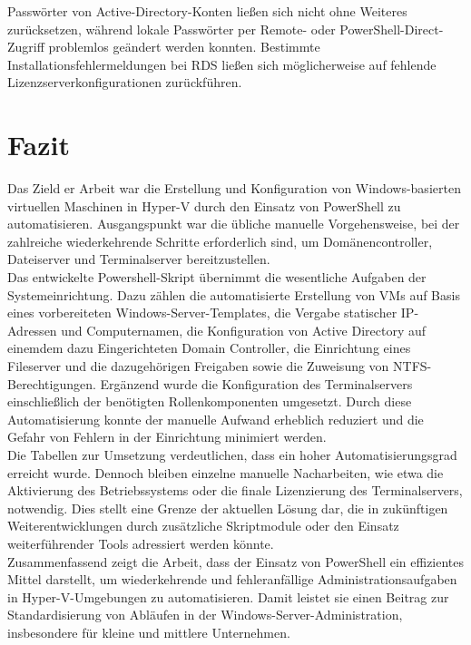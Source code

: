 \documentclass[a4paper,12pt]{article}
\begin{document}
Passwörter von Active-Directory-Konten ließen sich nicht ohne Weiteres zurücksetzen, während lokale Passwörter per Remote- oder PowerShell-Direct-Zugriff problemlos geändert werden konnten. Bestimmte Installationsfehlermeldungen bei RDS ließen sich möglicherweise auf fehlende Lizenzserverkonfigurationen zurückführen.\\

\newpage

\section{Fazit}

Das Zield er Arbeit war die Erstellung und Konfiguration von Windows-basierten virtuellen Maschinen in Hyper-V durch den Einsatz von PowerShell zu automatisieren.
Ausgangspunkt war die übliche manuelle Vorgehensweise, bei der zahlreiche wiederkehrende Schritte erforderlich sind, um Domänencontroller, Dateiserver und Terminalserver bereitzustellen.\\

Das entwickelte Powershell-Skript übernimmt die wesentliche Aufgaben der Systemeinrichtung. 
Dazu zählen die automatisierte Erstellung von VMs auf Basis eines vorbereiteten Windows-Server-Templates, die Vergabe statischer IP-Adressen und Computernamen, die Konfiguration von Active Directory auf einemdem dazu Eingerichteten Domain Controller, die Einrichtung eines Fileserver und die dazugehörigen Freigaben sowie die Zuweisung von NTFS-Berechtigungen. 
Ergänzend wurde die Konfiguration des Terminalservers einschließlich der benötigten Rollenkomponenten umgesetzt. 
Durch diese Automatisierung konnte der manuelle Aufwand erheblich reduziert und die Gefahr von Fehlern in der Einrichtung minimiert werden.\\

Die Tabellen zur Umsetzung verdeutlichen, dass ein hoher Automatisierungsgrad erreicht wurde.
Dennoch bleiben einzelne manuelle Nacharbeiten, wie etwa die Aktivierung des Betriebssystems oder die finale Lizenzierung des Terminalservers, notwendig.
Dies stellt eine Grenze der aktuellen Lösung dar, die in zukünftigen Weiterentwicklungen durch zusätzliche Skriptmodule oder den Einsatz weiterführender Tools adressiert werden könnte.\\

Zusammenfassend zeigt die Arbeit, dass der Einsatz von PowerShell ein effizientes Mittel darstellt, um wiederkehrende und fehleranfällige Administrationsaufgaben in Hyper-V-Umgebungen zu automatisieren. 
Damit leistet sie einen Beitrag zur Standardisierung von Abläufen in der Windows-Server-Administration, insbesondere für kleine und mittlere Unternehmen.\\
\end{document}
